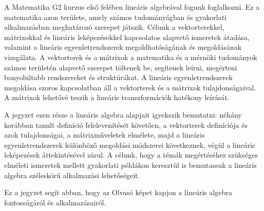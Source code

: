 \label{chap-01}

\bgroup
\color{gray!50!black}
\sffamily

A Matematika G2 kurzus első felében lineáris algebrával fogunk foglalkozni.
Ez a matematika azon területe, amely számos tudományágban és gyakorlati
alkalmazásban meghatározó szerepet játszik. Célunk a vektorterekkel, mátrixokkal
és lineáris leképezésekkel kapcsolatos alapvető ismeretek átadása, valamint a
lineáris egyenletrendszerek megoldhatóságának és megoldásának vizsgálata.
A vektorterek és a mátrixok a matematika és a mérnöki tudományok számos
területén alapvető szerepet töltenek be, segítenek leírni, megérteni
bonyolultabb rendszereket és struktúrákat. A lineáris egyenletrendszerek
megoldása szoros kapcsolatban áll a vektorterek és a mátrixok tulajdonságaival.
A mátrixok lehetővé teszik a lineáris transzformációk hatékony leírását.

A jegyzet ezen része a lineáris algebra alapjait igyekszik bemutatni: néhány
korábban tanult definíció felelevenítését követően, a vektorterek definíciója és
azok tulajdonságai, a mátrixműveletek elmélete, majd a lineáris
egyenletrendszerek különböző megoldási módszerei következnek, végül a lineáris
leképezések áttekintésével zárul. A célunk, hogy a témák megértéséhez szükséges
elméleti ismeretek mellett gyakorlati példákon keresztül is bemutassuk a
lineáris algebra széleskörű alkalmazási lehetőségeit.

Ez a jegyzet segít abban, hogy az Olvasó képet kapjon a lineáris algebra
fontosságáról és alkalmazásairól.

\chaptertoc
\egroup

\clearpage